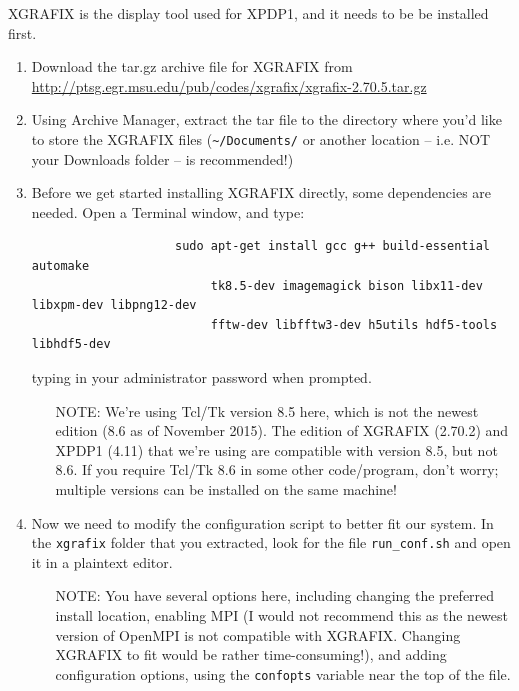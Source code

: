 \documentclass{article}
\begin{document}
	\noindent XGRAFIX is the display tool used for XPDP1, and it needs to be be installed first.
	\begin{enumerate}
		\item Download the tar.gz archive file for XGRAFIX from \\ \url{http://ptsg.egr.msu.edu/pub/codes/xgrafix/xgrafix-2.70.5.tar.gz}
		
		\item Using Archive Manager, extract the tar file to the directory where you'd like to store the XGRAFIX files (\verb|~/Documents/| or another location -- i.e. NOT your Downloads folder -- is recommended!)
		
		\item Before we get started installing XGRAFIX directly, some dependencies are needed. Open a Terminal window, and type:
		\begin{verbatim}
			        sudo apt-get install gcc g++ build-essential automake 
			             tk8.5-dev imagemagick bison libx11-dev libxpm-dev libpng12-dev 
			             fftw-dev libfftw3-dev h5utils hdf5-tools libhdf5-dev
		\end{verbatim}
		
		typing in your administrator password when prompted.
		\begin{enumerate}
			\item[NOTE:] We're using Tcl/Tk version 8.5 here, which is not the newest edition (8.6 as of November 2015). The edition of XGRAFIX (2.70.2) and XPDP1 (4.11) that we're using are compatible with version 8.5, but not 8.6. If you require Tcl/Tk 8.6 in some other code/program, don't worry; multiple versions can be installed on the same machine!
		\end{enumerate}
		
		\item Now we need to modify the configuration script to better fit our system. In the \verb|xgrafix| folder that you extracted, look for the file \verb|run_conf.sh| and open it in a plaintext editor. 
		\begin{enumerate} 
			\item[NOTE:] You have several options here, including changing the preferred install location, enabling MPI (I would not recommend this as the newest version of OpenMPI is not compatible with XGRAFIX. Changing XGRAFIX to fit would be rather time-consuming!), and adding configuration options, using the \verb|confopts| variable near the top of the file. 
		\end{enumerate}
		

\end{enumerate}
\end{document}
